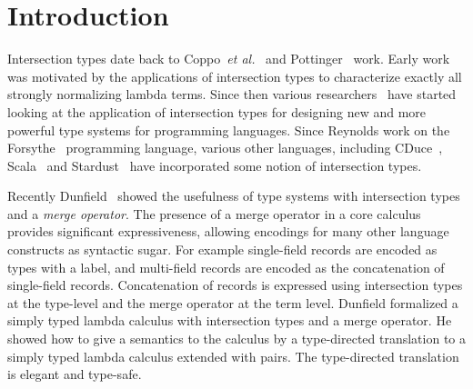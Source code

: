 \section{Introduction}
\label{sec:intro}

Intersection types date back to Coppo~\textit{et
  al.}~\cite{coppo1981functional} and Pottinger~\cite{Pottinger80type}
work. Early work was motivated by the applications of
intersection types to characterize exactly all strongly normalizing
lambda terms.
Since then various researchers~\cite{Freeman91refinement,pierce1991programming1,Castagna92calculus,pierce1997intersection,davies2000intersection,Dunfield03Intersections} have started looking at the application
of intersection types for designing new and more powerful type systems 
for programming languages. Since Reynolds work on the Forsythe~\cite{reynolds1997design}
programming language, various other languages, including
CDuce~\cite{Benzaken03cduce}, Scala~\cite{scala-overview} and 
Stardust~\cite{Dunfield07:Stardust} have incorporated some notion 
of intersection types.

Recently Dunfield~\cite{dunfield2014elaborating} showed the
usefulness of type systems with intersection types and a \emph{merge operator}. The presence of a merge
operator in a core calculus provides significant expressiveness, allowing
encodings for many other language constructs as syntactic sugar. For example
single-field records are encoded as types with a label, and multi-field
records are encoded as the concatenation of single-field records. Concatenation
of records is expressed using intersection types at the type-level and the
merge operator at the term level. Dunfield formalized a simply
typed lambda calculus with intersection types and a merge operator. He showed
how to give a semantics to the calculus by a type-directed translation to a
simply typed lambda calculus extended with pairs. The type-directed translation
is elegant and type-safe.

